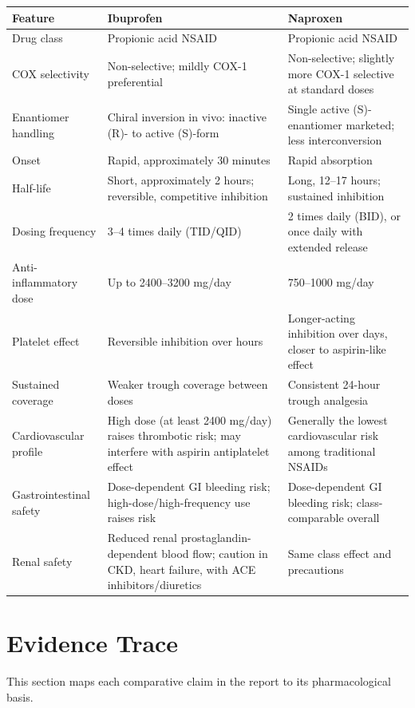 \documentclass[11pt]{article}
\begin{document}
\begin{longtable}{@{}p{4.2cm}p{6.0cm}p{6.0cm}@{}}
\toprule
\textbf{Feature} & \textbf{Ibuprofen} & \textbf{Naproxen} \\
\midrule
\endhead
Drug class & Propionic acid NSAID & Propionic acid NSAID \\
COX selectivity & Non-selective; mildly COX-1 preferential & Non-selective; slightly more COX-1 selective at standard doses \\
Enantiomer handling & Chiral inversion in vivo: inactive (R)- to active (S)-form & Single active (S)-enantiomer marketed; less interconversion \\
Onset & Rapid, approximately 30 minutes & Rapid absorption \\
Half-life & Short, approximately 2 hours; reversible, competitive inhibition & Long, 12--17 hours; sustained inhibition \\
Dosing frequency & 3--4 times daily (TID/QID) & 2 times daily (BID), or once daily with extended release \\
Anti-inflammatory dose & Up to 2400--3200 mg/day & 750--1000 mg/day \\
Platelet effect & Reversible inhibition over hours & Longer-acting inhibition over days, closer to aspirin-like effect \\
Sustained coverage & Weaker trough coverage between doses & Consistent 24-hour trough analgesia \\
Cardiovascular profile & High dose (at least 2400 mg/day) raises thrombotic risk; may interfere with aspirin antiplatelet effect & Generally the lowest cardiovascular risk among traditional NSAIDs \\
Gastrointestinal safety & Dose-dependent GI bleeding risk; high-dose/high-frequency use raises risk & Dose-dependent GI bleeding risk; class-comparable overall \\
Renal safety & Reduced renal prostaglandin-dependent blood flow; caution in CKD, heart failure, with ACE inhibitors/diuretics & Same class effect and precautions \\
\bottomrule
\end{longtable}

\section{Evidence Trace}
This section maps each comparative claim in the report to its pharmacological basis.
\end{document}
